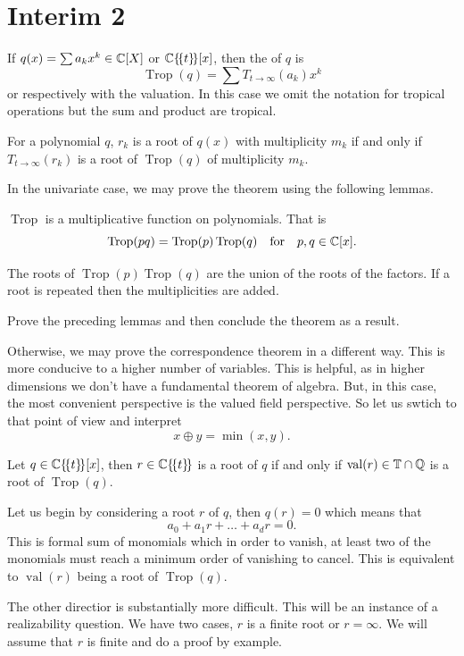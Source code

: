 \documentclass[12pt]{memoir}
\DeclareMathOperator{\val}{val}
\DeclareMathOperator{\Trop}{Trop}
\begin{document}
\section{Interim 2}

\begin{Def}
    If $q(x)=\sum a_kx^k\in\mathbb{C}[X]$ or $\mathbb{C}\{\!\{t\}\!\}[x]$, then the  of $q$ is 
    $$\Trop(q)=\sum T_{t\to\infty}(a_k)x^k$$
    or respectively with the valuation. In this case we omit the notation for tropical operations but the sum and product are tropical.
\end{Def}

\begin{Th}
For a polynomial $q$, $r_k$ is a root of $q(x)$ with multiplicity $m_k$ if and only if $T_{t\to\infty}(r_k)$ is a root of $\Trop(q)$ of multiplicity $m_k$.
\end{Th}

In the univariate case, we may prove the theorem using the following lemmas.

\begin{Lem}
$\Trop$ is a multiplicative function on polynomials. That is
$$\Trop(pq)=\Trop(p)\Trop(q)\word{for}p,q\in\bC[x].$$
\end{Lem}

\begin{Lem}
The roots of $\Trop(p)\Trop(q)$ are the union of the roots of the factors. If a root is repeated then the multiplicities are added.
\end{Lem}

\begin{Ej}[2]
Prove the preceding lemmas and then conclude the theorem as a result.
\end{Ej}

Otherwise, we may prove the correspondence theorem in a different way. This is more conducive to a higher number of variables. This is helpful, as in higher dimensions we don't have a fundamental theorem of algebra. But, in this case, the most convenient perspective is the valued field perspective. So let us swtich to that point of view and interpret 
$$x\oplus y=\min(x,y).$$

\begin{Th}
Let $q\in\mathbb{C}\{\!\{t\}\!\}[x]$, then $r\in\mathbb{C}\{\!\{t\}\!\}$ is a root of $q$ if and only if $\val(r)\in\bT\cap\bQ$ is a root of $\Trop(q)$.
\end{Th}

\begin{ptcbp}
Let us begin by considering a root $r$ of $q$, then $q(r)=0$ which means that 
$$a_0+a_1r+\dots+a_dr=0.$$
This is formal sum of monomials which in order to vanish, at least two of the monomials must reach a minimum order of vanishing to cancel. This is equivalent to $\val(r)$ being a root of $\Trop(q)$. \par %
The other directior is substantially more difficult. This will be an instance of a realizability question. We have two cases, $r$ is a finite root or $r=\infty$. We will assume that $r$ is finite and do a proof by example. 
\end{ptcbp}
\end{document}
